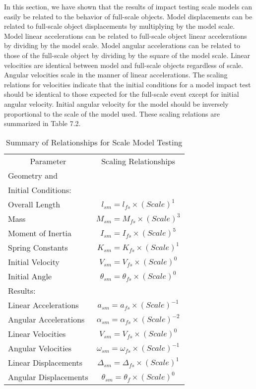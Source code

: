     In this section, we have shown that the results of impact testing
scale models can easily be related to the behavior of full-scale
objects.  Model displacements can be related to full-scale object
displacements by multiplying by the model scale.  Model linear
accelerations can be related to full-scale object linear accelerations
by dividing by the model scale.  Model angular accelerations can be
related to those of the full-scale object by dividing by the square of
the model scale. Linear velocities are identical between model and
full-scale objects regardless of scale.  Angular velocities scale in
the manner of linear accelerations.  The scaling relations for
velocities indicate that the initial conditions for a model impact
test should be identical to those expected for the full-scale event
except for initial angular velocity.  Initial angular velocity for the
model should be inversely proportional to the scale of the model used.
These scaling relations are summarized in Table 7.2.
\begin{table}
\begin{center}
\caption{Summary of Relationships for Scale Model Testing}
\makeqnum
\begin{tabular}{||l|c||}
\hline
\multicolumn{1}{|c}{Parameter}
 &\multicolumn{1}{|c||}{Scaling Relationships}\\
Geometry and & \\
Initial Conditions: &\\
\quad Overall Length     & $l_{sm} = l_{fs} \times (Scale)^{1}$\\
\quad Mass               & $M_{sm} = M_{fs} \times (Scale)^{3}$\\
\quad Moment of Inertia  & $I_{sm} = I_{fs} \times (Scale)^{5}$\\
\quad Spring Constants   & $K_{sm} = K_{fs} \times (Scale)^{1}$\\
\quad Initial Velocity   & $V_{sm} = V_{fs} \times (Scale)^{0}$\\
\quad Initial Angle      & $\theta _{sm} = \theta _{fs} \times 
(Scale)^{0}$\\
\hline
Results: & \\
\quad    Linear Accelerations  & $a_{sm} = a_{fs} \times (Scale)^{-1}$\\
\quad    Angular Accelerations & $\alpha _{sm} = \alpha _{fs} \times 
(Scale)^{-2}$\\
\quad    Linear Velocities     & $V_{sm} = V_{fs} \times (Scale)^{0}$\\
\quad    Angular Velocities    & $\omega _{sm} = \omega _{fs} \times 
(Scale)^{-1}$\\
\quad    Linear Displacements  & $\Delta _{sm} = \Delta _{fs} \times 
(Scale)^{1}$\\
\quad    Angular Displacements & $\theta _{sm} = \theta _{f} \times 
(Scale)^{0}$\\
\hline
\end{tabular}
\end{center}
\end{table}


